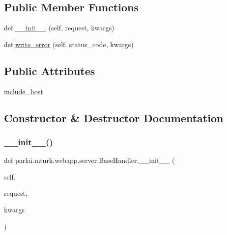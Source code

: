 \subsection*{Public Member Functions}
\begin{DoxyCompactItemize}
\item 
def \hyperlink{classparlai_1_1mturk_1_1webapp_1_1server_1_1BaseHandler_aa09a199cc63b8a1294fdbd98688d8b09}{\+\_\+\+\_\+init\+\_\+\+\_\+} (self, request, kwargs)
\item 
def \hyperlink{classparlai_1_1mturk_1_1webapp_1_1server_1_1BaseHandler_a5598d255e3912452fbfcab561819840e}{write\+\_\+error} (self, status\+\_\+code, kwargs)
\end{DoxyCompactItemize}
\subsection*{Public Attributes}
\begin{DoxyCompactItemize}
\item 
\hyperlink{classparlai_1_1mturk_1_1webapp_1_1server_1_1BaseHandler_a757114ed91180c7263e809175993ad07}{include\+\_\+host}
\end{DoxyCompactItemize}


\subsection{Constructor \& Destructor Documentation}
\mbox{\label{classparlai_1_1mturk_1_1webapp_1_1server_1_1BaseHandler_aa09a199cc63b8a1294fdbd98688d8b09}} 
\subsubsection{\texorpdfstring{\+\_\+\+\_\+init\+\_\+\+\_\+()}{\_\_init\_\_()}}
{\footnotesize\ttfamily def parlai.\+mturk.\+webapp.\+server.\+Base\+Handler.\+\_\+\+\_\+init\+\_\+\+\_\+ (\begin{DoxyParamCaption}\item[{}]{self,  }\item[{}]{request,  }\item[{}]{kwargs }\end{DoxyParamCaption})}



